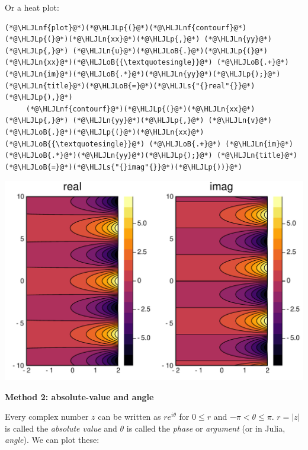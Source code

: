 \documentclass[12pt,a4paper]{article}
\newcommand{\HLJLn}[1]{#1}
\newcommand{\HLJLnf}[1]{\textcolor[RGB]{66,102,213}{#1}}
\newcommand{\HLJLs}[1]{\textcolor[RGB]{201,61,57}{#1}}
\newcommand{\HLJLoB}[1]{\textcolor[RGB]{102,102,102}{\textbf{#1}}}
\newcommand{\HLJLp}[1]{#1}
\begin{document}
Or a heat plot:


\begin{lstlisting}
(*@\HLJLnf{plot}@*)(*@\HLJLp{(}@*)(*@\HLJLnf{contourf}@*)(*@\HLJLp{(}@*)(*@\HLJLn{xx}@*)(*@\HLJLp{,}@*) (*@\HLJLn{yy}@*)(*@\HLJLp{,}@*) (*@\HLJLn{u}@*)(*@\HLJLoB{.}@*)(*@\HLJLp{(}@*)(*@\HLJLn{xx}@*)(*@\HLJLoB{{\textquotesingle}}@*) (*@\HLJLoB{.+}@*) (*@\HLJLn{im}@*)(*@\HLJLoB{.*}@*)(*@\HLJLn{yy}@*)(*@\HLJLp{);}@*) (*@\HLJLn{title}@*)(*@\HLJLoB{=}@*)(*@\HLJLs{"{}real"{}}@*)(*@\HLJLp{),}@*)
     (*@\HLJLnf{contourf}@*)(*@\HLJLp{(}@*)(*@\HLJLn{xx}@*)(*@\HLJLp{,}@*) (*@\HLJLn{yy}@*)(*@\HLJLp{,}@*) (*@\HLJLn{v}@*)(*@\HLJLoB{.}@*)(*@\HLJLp{(}@*)(*@\HLJLn{xx}@*)(*@\HLJLoB{{\textquotesingle}}@*) (*@\HLJLoB{.+}@*) (*@\HLJLn{im}@*)(*@\HLJLoB{.*}@*)(*@\HLJLn{yy}@*)(*@\HLJLp{);}@*) (*@\HLJLn{title}@*)(*@\HLJLoB{=}@*)(*@\HLJLs{"{}imag"{}}@*)(*@\HLJLp{))}@*)
\end{lstlisting}

\includegraphics[width=\linewidth]{figures/Lecture1_2_1.pdf}

\textbf{Method 2: absolute-value and angle}

Every complex number $z$ can be written as $re^{i \theta}$ for $0 \leq r$ and $-\pi < \theta \leq \pi$. $r = |z|$ is called the \emph{absolute value} and $\theta$ is called the \emph{phase} or \emph{argument} (or in Julia, \emph{angle}).  We can plot these:
\end{document}
